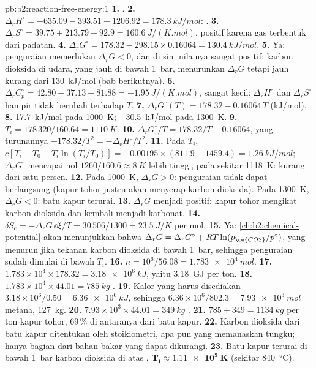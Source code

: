 \begin{solution}{pb:b2:reaction-free-energy:1}
\textbf{1.} .
\textbf{2.} $\Delta_r H^\circ = -635.09 - 393.51 + 1206.92 =
\qty{+178.3}{kJ/mol}$: .
\textbf{3.} $\Delta_r S^\circ = 39.75 + 213.79 - 92.9 = \qty{+160.6}{J/(K.mol)}$,
positif karena gas terbentuk dari padatan.
\textbf{4.} $\Delta_r G^\circ = 178.32 - 298.15 \times 0.16064 =
\qty{+130.4}{kJ/mol}$.
\textbf{5.} Ya: penguraian memerlukan $\Delta_r G < 0$, dan di sini nilainya
sangat positif; karbon dioksida di udara, yang jauh di bawah \qty{1}{bar},
menurunkan $\Delta_r G$ tetapi jauh kurang dari \qty{130}{kJ/mol} (bab
berikutnya).
\textbf{6.} $\Delta_r C^\circ_p = 42.80 + 37.13 - 81.88 =
\qty{-1.95}{J/(K.mol)}$, sangat kecil: $\Delta_r H^\circ$ dan
$\Delta_r S^\circ$ hampir tidak berubah terhadap $T$.
\textbf{7.} $\Delta_r G^\circ(T) = 178.32 - 0.16064\,T$ (\unit{kJ/mol}).
\textbf{8.} \qty{+17.7}{kJ/mol} pada \qty{1000}{K}; \qty{-30.5}{kJ/mol}
pada \qty{1300}{K}.
\textbf{9.} $T_i = 178\,320/160.64 = \qty{1110}{K}$.
\textbf{10.} $\Delta_r G^\circ/T = 178.32/T - 0.16064$, yang turunannya
$-178.32/T^2 = -\Delta_r H^\circ/T^2$.
\textbf{11.} Pada $T_i$, $c[T_i - T_0 - T_i\ln(T_i/T_0)] = -0.00195 \times
(811.9 - 1459.4) = \qty{+1.26}{kJ/mol}$; $\Delta_r G^\circ$ mencapai nol
$1260/160.6 \approx \qty{8}{K}$ lebih tinggi, pada sekitar
\qty{1118}{K}: kurang dari satu persen.
\textbf{12.} Pada \qty{1000}{K}, $\Delta_r G > 0$: penguraian tidak dapat
berlangsung (kapur tohor justru akan menyerap karbon dioksida). Pada
\qty{1300}{K}, $\Delta_r G <
0$: batu kapur terurai.
\textbf{13.} $\Delta_r G$ menjadi positif: kapur tohor mengikat karbon
dioksida dan kembali menjadi karbonat.
\textbf{14.} $\delta S_{\text{c}} = -\Delta_r G\,\dd\xi/T = 30\,506/1300 =
\qty{23.5}{J/K}$ per mol.
\textbf{15.} Ya: \cref{ch:b2:chemical-potential} akan menunjukkan bahwa
$\Delta_r G = \Delta_r G^\circ + RT\ln(p_{\ce{CO2}}/p^\circ)$, yang
menurun jika tekanan karbon dioksida di bawah \qty{1}{bar}, sehingga
penguraian sudah dimulai di bawah $T_i$.
\textbf{16.} $n = 10^6/56.08 = \qty{1.783e4}{mol}$.
\textbf{17.} $1.783 \times 10^4 \times 178.32 = \qty{3.18e6}{kJ}$, yaitu
\qty{3.18}{GJ} per ton.
\textbf{18.} $1.783 \times 10^4 \times 44.01 = \qty{785}{kg}$ .
\textbf{19.} Kalor yang harus disediakan $3.18 \times 10^6/0.50 = \qty{6.36e6}{kJ}$, sehingga $6.36 \times 10^6/802.3 = \qty{7.93e3}{mol}$
metana, \qty{127}{kg}.
\textbf{20.} $7.93 \times 10^3 \times 44.01 = \qty{349}{kg}$ .
\textbf{21.} $785 + 349 = \qty{1134}{kg}$ per ton kapur tohor, 69\,\% di
antaranya dari batu kapur.
\textbf{22.} Karbon dioksida dari batu kapur ditentukan oleh
stoikiometri, apa pun yang memanaskan tungku; hanya bagian dari bahan
bakar yang dapat dikurangi.
\textbf{23.} Batu kapur terurai di bawah \qty{1}{bar} karbon dioksida di
atas , $\boldsymbol{T_i \approx \qty{1.11e3}{K}}$ (sekitar
\qty{840}{\celsius}).
\end{solution}
